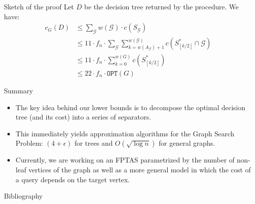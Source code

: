 \documentclass{beamer}
\newcommand{\br}[1]{\mathopen{}\left( #1 \right)}
\newcommand{\fl}[1]{\mathopen{}\left\lfloor #1 \right\rfloor}
\newcommand{\OPT}{\texttt{OPT}}
\begin{document}
\begin{frame}{Sketch of the proof}
    Let $D$ be the decision tree returned by the procedure. We have:
        \begin{align*}
            c_G\br{D}&\leq \sum_{\mathcal{G}}w\br{\mathcal{G}}\cdot c\br{S_{\mathcal{G}}}\\
            &\leq 11 \cdot f_n\cdot \sum_{\mathcal{G}}\sum_{k=w\br{A_{\mathcal{G}}}+1}^{w\br{\mathcal{G}}}c\br{S_{\fl{k/2}}^*\cap \mathcal{G}}
            \\&\leq 
            11 \cdot f_n\cdot\sum_{k=0}^{w\br{G}}c\br{S_{\fl{k/2}}^*} \\
            &\leq 22 \cdot f_n\cdot \OPT\br{G}
        \end{align*}
\end{frame}
\begin{frame}{Summary}
\begin{itemize}
    \item The key idea behind our lower bounds is to decompose the optimal decision tree (and its cost) into a series of separators.
    \pause
    \item This immediately yields approximation algorithms for the Graph Search Problem:  $\br{4+\epsilon}$ for trees and $O\br{\sqrt{\log n}}$ for general graphs.
    \pause
    \item Currently, we are working on an FPTAS parametrized by the number of non-leaf vertices of the graph as well as a more general model in which the cost of a query depends on the target vertex.
\end{itemize}
\end{frame}

\begin{frame}[allowframebreaks]{Bibliography}
\printbibliography
\end{frame}
\end{document}
